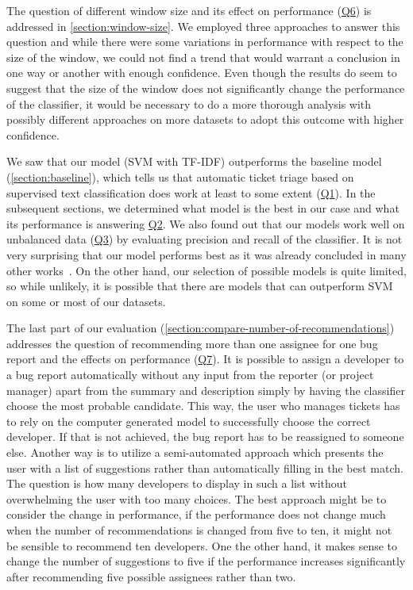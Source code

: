 The question of different window size and its effect on performance (\hyperlink{question:6}{Q6}) is addressed in \autoref{section:window-size}. We employed three approaches to answer this question and while there were some variations in performance with respect to the size of the window, we could not find a trend that would warrant a conclusion in one way or another with enough confidence. Even though the results do seem to suggest that the size of the window does not significantly change the performance of the classifier, it would be necessary to do a more thorough analysis with possibly different approaches on more datasets to adopt this outcome with higher confidence.

We saw that our model (SVM with TF-IDF) outperforms the baseline model (\autoref{section:baseline}), which tells us that automatic ticket triage based on supervised text classification does work at least to some extent (\hyperlink{question:1}{Q1}). In the subsequent sections, we determined what model is the best in our case and what its performance is answering \hyperlink{question:2}{Q2}. We also found out that our models work well on unbalanced data (\hyperlink{question:3}{Q3}) by evaluating precision and recall of the classifier. It is not very surprising that our model performs best as it was already concluded in many other works~\cite{Anvik2006, Ahsan2009, Somasundaram2012}. On the other hand, our selection of possible models is quite limited, so while unlikely, it is possible that there are models that can outperform SVM on some or most of our datasets.

The last part of our evaluation (\autoref{section:compare-number-of-recommendations}) addresses the question of recommending more than one assignee for one bug report and the effects on performance (\hyperlink{question:7}{Q7}). It is possible to assign a developer to a bug report automatically without any input from the reporter (or project manager) apart from the summary and description simply by having the classifier choose the most probable candidate. This way, the user who manages tickets has to rely on the computer generated model to successfully choose the correct developer. If that is not achieved, the bug report has to be reassigned to someone else. Another way is to utilize a semi-automated approach which presents the user with a list of suggestions rather than automatically filling in the best match. The question is how many developers to display in such a list without overwhelming the user with too many choices. The best approach might be to consider the change in performance, if the performance does not change much when the number of recommendations is changed from five to ten, it might not be sensible to recommend ten developers. One the other hand, it makes sense to change the number of suggestions to five if the performance increases significantly after recommending five possible assignees rather than two.

